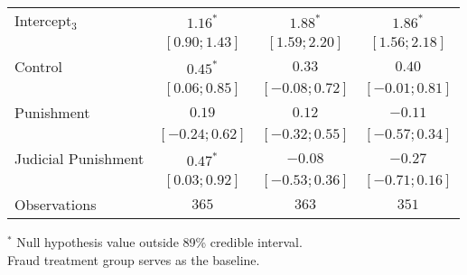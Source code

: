 \begin{table}[h]
\begin{center}
\begin{threeparttable}
\begin{tabular}{l c c c}
Intercept$_3$       & $1.16^{*}$        & $1.88^{*}$        & $1.86^{*}$        \\
                    & $ [ 0.90;  1.43]$ & $ [ 1.59;  2.20]$ & $ [ 1.56;  2.18]$ \\
Control             & $0.45^{*}$        & $0.33$            & $0.40$            \\
                    & $ [ 0.06;  0.85]$ & $ [-0.08;  0.72]$ & $ [-0.01;  0.81]$ \\
Punishment          & $0.19$            & $0.12$            & $-0.11$           \\
                    & $ [-0.24;  0.62]$ & $ [-0.32;  0.55]$ & $ [-0.57;  0.34]$ \\
Judicial Punishment & $0.47^{*}$        & $-0.08$           & $-0.27$           \\
                    & $ [ 0.03;  0.92]$ & $ [-0.53;  0.36]$ & $ [-0.71;  0.16]$ \\
\hline
Observations        & $365$             & $363$             & $351$             \\
\hline
\end{tabular}
\begin{tablenotes}[flushleft]
\scriptsize{$^*$ Null hypothesis value outside 89\% credible interval.  \\
Fraud treatment group serves as the baseline.}
\end{tablenotes}
\end{threeparttable}
\label{table:ol_main_la_npol_376}
\end{center}
\end{table}
